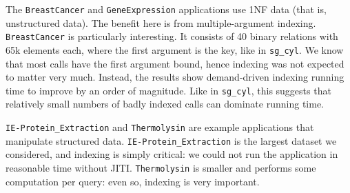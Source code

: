 \documentclass{llncs}
\newcommand{\JITI}{demand-driven indexing\xspace}
\begin{document}
The \texttt{BreastCancer} and \texttt{GeneExpression} applications use
1NF data (that is, unstructured data). The benefit here is from
multiple-argument indexing.  \texttt{BreastCancer} is particularly
interesting. It consists of 40 binary relations with 65k elements
each, where the first argument is the key, like in \texttt{sg\_cyl}. We
know that most calls have the first argument bound, hence indexing was
not expected to matter very much. Instead, the results show \JITI
running time to improve by an order of magnitude. Like in
\texttt{sg\_cyl}, this suggests that relatively small numbers of badly
indexed calls can dominate running time.

\texttt{IE-Protein\_Extraction} and \texttt{Thermolysin} are example
applications that manipulate structured data.
\texttt{IE-Protein\_Extraction} is the largest dataset we considered,
and indexing is simply critical: we could not run the application in
reasonable time without JITI. \texttt{Thermolysin} is smaller and
performs some computation per query: even so, indexing is very
important.
\end{document}

